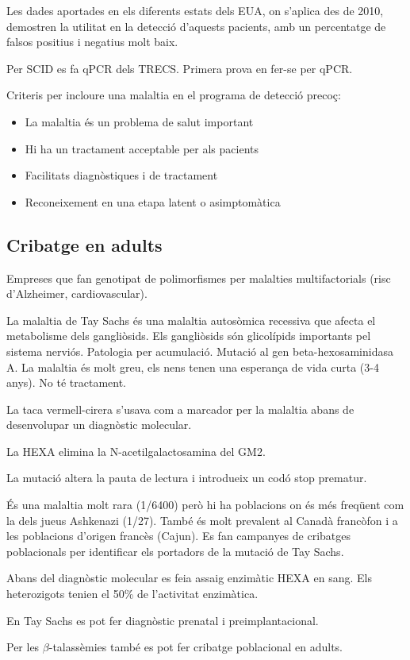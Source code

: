 Les dades aportades en els diferents estats dels EUA, on s'aplica des de 2010, demostren la utilitat en la detecció d'aquests pacients, amb un percentatge de falsos positius i negatius molt baix.

Per SCID es fa qPCR dels TRECS. Primera prova en fer-se per qPCR. %

Criteris per incloure una malaltia en el programa de detecció precoç:
\begin{itemize}
\item La malaltia és un problema de salut important
  
\item Hi ha un tractament acceptable per als pacients
  
\item Facilitats diagnòstiques i de tractament
  
\item Reconeixement en una etapa latent o asimptomàtica
\end{itemize}

\subsection{Cribatge en adults}
Empreses que fan genotipat de polimorfismes per malalties multifactorials (risc d'Alzheimer, cardiovascular).

La malaltia de Tay Sachs és una malaltia autosòmica recessiva que afecta el metabolisme dels gangliòsids. Els gangliòsids són glicolípids importants pel sistema nerviós. Patologia per acumulació. Mutació al gen beta-hexosaminidasa A. La malaltia és molt greu, els nens tenen una esperança de vida curta (3-4 anys). No té tractament.

La taca vermell-cirera s'usava com a marcador per la malaltia abans de desenvolupar un diagnòstic molecular.

La HEXA elimina la N-acetilgalactosamina del GM2.

La mutació altera la pauta de lectura i introdueix un codó stop prematur.

És una malaltia molt rara (1/6400) però hi ha poblacions on és més freqüent com la dels jueus Ashkenazi (1/27). També és molt prevalent al Canadà francòfon i a les poblacions d'origen francès (Cajun). Es fan campanyes de cribatges poblacionals per identificar els portadors de la mutació de Tay Sachs.

Abans del diagnòstic molecular es feia assaig enzimàtic HEXA en sang. Els heterozigots tenien el 50\% de l'activitat enzimàtica.

En Tay Sachs es pot fer diagnòstic prenatal i preimplantacional.

Per les $\beta$-talassèmies també es pot fer cribatge poblacional en adults.
